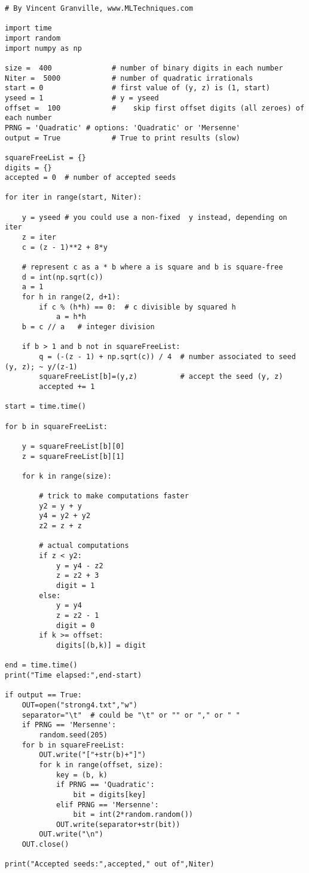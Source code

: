 \documentclass[oneside,10pt]{book}
\begin{document}
\begin{lstlisting}
# By Vincent Granville, www.MLTechniques.com

import time
import random
import numpy as np

size =  400              # number of binary digits in each number
Niter =  5000            # number of quadratic irrationals
start = 0                # first value of (y, z) is (1, start)
yseed = 1                # y = yseed
offset =  100            #    skip first offset digits (all zeroes) of each number
PRNG = 'Quadratic' # options: 'Quadratic' or 'Mersenne'
output = True            # True to print results (slow)

squareFreeList = {}
digits = {}
accepted = 0  # number of accepted seeds

for iter in range(start, Niter):

    y = yseed # you could use a non-fixed  y instead, depending on iter
    z = iter
    c = (z - 1)**2 + 8*y

    # represent c as a * b where a is square and b is square-free
    d = int(np.sqrt(c))
    a = 1
    for h in range(2, d+1):
        if c % (h*h) == 0:  # c divisible by squared h
            a = h*h
    b = c // a   # integer division

    if b > 1 and b not in squareFreeList:
        q = (-(z - 1) + np.sqrt(c)) / 4  # number associated to seed (y, z); ~ y/(z-1)
        squareFreeList[b]=(y,z)          # accept the seed (y, z)
        accepted += 1

start = time.time()

for b in squareFreeList:

    y = squareFreeList[b][0]
    z = squareFreeList[b][1]

    for k in range(size):

        # trick to make computations faster
        y2 = y + y
        y4 = y2 + y2
        z2 = z + z

        # actual computations
        if z < y2:
            y = y4 - z2
            z = z2 + 3
            digit = 1
        else:
            y = y4
            z = z2 - 1
            digit = 0
        if k >= offset:
            digits[(b,k)] = digit

end = time.time()
print("Time elapsed:",end-start)

if output == True:
    OUT=open("strong4.txt","w")
    separator="\t"  # could be "\t" or "" or "," or " "
    if PRNG == 'Mersenne':
        random.seed(205)
    for b in squareFreeList:
        OUT.write("["+str(b)+"]")
        for k in range(offset, size):
            key = (b, k)
            if PRNG == 'Quadratic':
                bit = digits[key]
            elif PRNG == 'Mersenne':
                bit = int(2*random.random())
            OUT.write(separator+str(bit))
        OUT.write("\n")
    OUT.close()

print("Accepted seeds:",accepted," out of",Niter)


\end{lstlisting}
\end{document}
